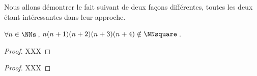 Nous allons démontrer le fait suivant de deux façons différentes, toutes les deux étant intéressantes dans leur approche.

\begin{fact}
	 $\forall n \in \NNs$\,, $n(n+1)(n+2)(n+3)(n+4) \notin \NNsquare$\,.
\end{fact}




\begin{proof}
	 XXX
\end{proof}




\begin{proof}
	 XXX
\end{proof}